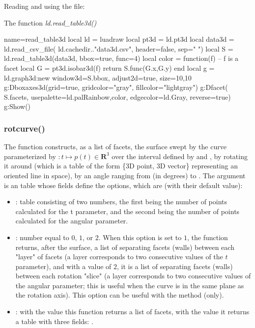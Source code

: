 Reading and using the file:
\begin{demo}{The function \emph{ld.read\_table3d()}}
\begin{luadraw}{name=read_table3d}
local ld = luadraw
local pt3d  = ld.pt3d
local data3d = ld.read_csv_file( ld.cachedir.."data3d.csv", {header=false, sep=" "})
local S = ld.read_table3d(data3d, {bbox=true, func=4})
local color = function(f) -- f is a facet
    local G = pt3d.isobar3d(f)
    return S.func(G.x,G.y)
end
local g = ld.graph3d:new{ window3d=S.bbox, adjust2d=true, size={10,10} }
g:Dboxaxes3d({grid=true, gridcolor="gray", fillcolor="lightgray"})
g:Dfacet( S.facets, {usepalette={ld.palRainbow,color}, edgecolor=ld.Gray, reverse=true})
g:Show()
\end{luadraw}
\end{demo}


\subsubsection{rotcurve()}
The function  constructs, as a list of facets, the surface swept by the curve parameterized by $\colon t\mapsto p(t)\in \mathbf R^3$ over the interval defined by  and , by rotating it around  (which is a table of the form \{3D point, 3D vector\} representing an oriented line in space), by an angle ranging from  (in degrees) to . The argument  is an table whose fields define the options, which are (with their default value):
\begin{itemize}
    \item {}: table consisting of two numbers, the first being the number of points calculated for the t parameter, and the second being the number of points calculated for the angular parameter.

    \item {}: number equal to $0$, $1$, or $2$. When this option is set to $1$, the function returns, after the surface, a list of separating facets (walls) between each "layer" of facets (a layer corresponds to two consecutive values ​​of the $t$ parameter), and with a value of $2$, it is a list of separating facets (walls) between each rotation "slice" (a layer corresponds to two consecutive values ​​of the angular parameter; this is useful when the curve is in the same plane as the rotation axis). This option can be useful with the  method (only).
    
       \item {} : with the value \false this function returns a list of facets, with the value \true it returns a table with three fields: . 
\end{itemize}


